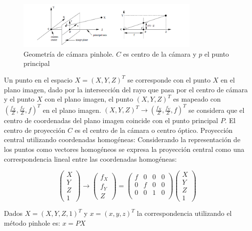 \begin{figure}[H]
  \centering
    \includegraphics[width=0.8\textwidth]{./Cap6_reconstruccion/pinhole.png}
  \caption{Geometría de cámara pinhole. $C$ es centro de la cámara y $p$ el punto principal}
  \label{fig:Calib-Pinhole}
\end{figure}

Un punto en el espacio $X=(X,Y,Z)^T$ se corresponde con el punto $X$ en el plano imagen, dado por la intersección del rayo que pasa por el centro de cámara y el punto $X$ con el plano imagen, el punto $(X,Y,Z)^T$ es mapeado con $(\frac{f_X}{Z}, \frac{f_Y}{Z}, f)^T$ en el plano imagen.
$(X, Y, Z)^T \to (\frac{f_X}{Z}, \frac{f_Y}{Z},f)^T$ se considera que el centro de coordenadas del plano imagen coincide con el punto principal $P$.
El centro de proyección $C$ es el centro de la cámara o centro óptico.
Proyección central utilizando coordenadas homogéneas:
Considerando la representación de los puntos como vectores homogéneos se expresa la proyección central como una correspondencia lineal entre las coordenadas homogéneas:

\[
\begin{pmatrix}
X \\ Y \\ Z \\ 1
\end{pmatrix}
\to
\begin{pmatrix}
f_X \\ f_Y \\ Z
\end{pmatrix}
=
\begin{pmatrix}
f & 0 & 0 & 0 \\
0 & f & 0 & 0 \\
0 & 0 & 1 & 0 \\
\end{pmatrix}
\begin{pmatrix}
X \\ Y \\ Z \\ 1
\end{pmatrix}
\]

Dados $X = (X,Y,Z,1)^T$ y $x =(x,y,z)^T$ la correspondencia utilizando el método pinhole es:
$x=PX$

